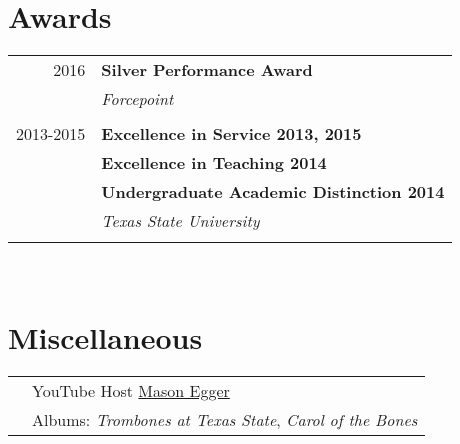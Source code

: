 \documentclass[10pt]{article} %
\begin{document}
\hfill
\begin{minipage}[t]{0.44\textwidth} %
\vspace{0pt} %


\section{Awards} 

\begin{tabular}{rl}
2016     & \textbf{Silver Performance Award}\\
& \textit{Forcepoint}\\ \\

2013-2015     & \textbf{Excellence in Service 2013, 2015}\\
& \textbf{Excellence in Teaching 2014}\\
& \textbf{Undergraduate Academic Distinction 2014}\\
& \textit{Texas State University}\\\\

\end{tabular}\\




\section{Miscellaneous} 

\begin{tabular}{rl}
& YouTube Host \href{https://www.youtube.com/masonegger}{Mason Egger}\\
& Albums: \textit{Trombones at Texas State}, \textit{Carol of the Bones} \\
\end{tabular}\\

\end{minipage}
\end{document}
